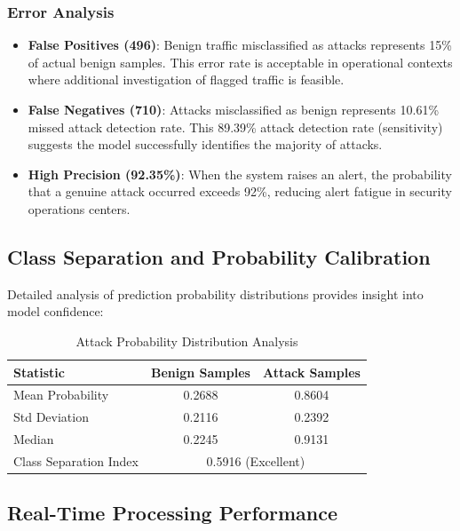 \documentclass[conference]{IEEEtran}
\begin{document}
\subsubsection{Error Analysis}

\begin{itemize}
    \item \textbf{False Positives (496)}: Benign traffic misclassified as attacks represents 15\% of actual benign samples. This error rate is acceptable in operational contexts where additional investigation of flagged traffic is feasible.
    \item \textbf{False Negatives (710)}: Attacks misclassified as benign represents 10.61\% missed attack detection rate. This 89.39\% attack detection rate (sensitivity) suggests the model successfully identifies the majority of attacks.
    \item \textbf{High Precision (92.35\%)}: When the system raises an alert, the probability that a genuine attack occurred exceeds 92\%, reducing alert fatigue in security operations centers.
\end{itemize}

\subsection{Class Separation and Probability Calibration}

Detailed analysis of prediction probability distributions provides insight into model confidence:

\begin{table}[H]
\centering
\caption{Attack Probability Distribution Analysis}
\begin{tabular}{|l|c|c|}
\hline
\textbf{Statistic} & \textbf{Benign Samples} & \textbf{Attack Samples} \\
\hline
Mean Probability & 0.2688 & 0.8604 \\
\hline
Std Deviation & 0.2116 & 0.2392 \\
\hline
Median & 0.2245 & 0.9131 \\
\hline
Class Separation Index & \multicolumn{2}{c|}{0.5916 (Excellent)} \\
\hline
\end{tabular}
\end{table}

\subsection{Real-Time Processing Performance}
\end{document}
